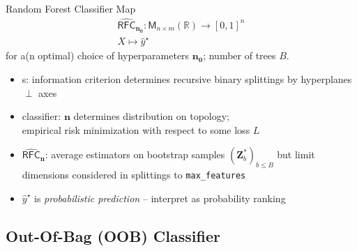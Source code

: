 \documentclass[handout]{beamer}
\begin{document}
\begin{frame}
\begin{block}{Random Forest Classifier Map}
\begin{equation*}\label{eq:RFC-Theta}
\begin{gathered}
\operatorname{\widehat{\mathsf{RFC}}}_\mathbf{n_0} : 
\mathsf{M}_{n \times m} (\mathbb{R}) \rightarrow [0, 1]^n \\ 
X \mapsto \hat{y}^\star
\end{gathered}
\end{equation*}
for a(n optimal) choice of hyperparameters $\mathbf{n_0}$; number of trees $B$.
\end{block}
\vfill
\begin{itemize}
 \item \Summertree s: information criterion determines recursive binary 
 splittings by hyperplanes $\perp$ axes
 \vfill
 \item \Summertree classifier: $\mathbf{n}$ determines distribution on \Summertree topology; \\
 empirical risk minimization with respect to some loss $L$
 \vfill
 \item \(\operatorname{\widehat{\mathsf{RFC}}}_\mathbf{n}\):  average \Summertree estimators on bootstrap samples $(\mathbf{Z}^*_b)_{b \leq B}$ but limit dimensions considered in splittings to \texttt{max\_features}
 \vfill 
\item$\hat{y}^\star$ is \emph{probabilistic prediction} --  interpret as probability ranking
\end{itemize}

 \end{frame}

\subsection{Out-Of-Bag (OOB) Classifier}
\end{document}
